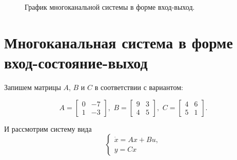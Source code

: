 \documentclass[a5paper, 10pt]{article}
\theoremstyle{definition}
\theoremstyle{plain}
\theoremstyle{remark}
\begin{document}
\begin{figure}[h]
\caption{График многоканальной системы в форме вход-выход.}
\end{figure}

\newpage
\section{Многоканальная система в форме вход-состояние-выход}
Запишем матрицы $A$, $B$ и $C$ в соответствии с вариантом:

\begin{equation*}
A = 
\begin{bmatrix}
0 & -7\\
1 & -3
\end{bmatrix},\,\,
B = 
\begin{bmatrix}
9 & 3\\
4 & 5
\end{bmatrix}, \,\,
C = 
\begin{bmatrix}
4 & 6\\
5 & 1
\end{bmatrix}.
\end{equation*}

И рассмотрим систему вида
\begin{equation*}
\begin{cases}
\dot{x} = Ax + Bu,\\
y = Cx
\end{cases}
\end{equation*}
\end{document}
